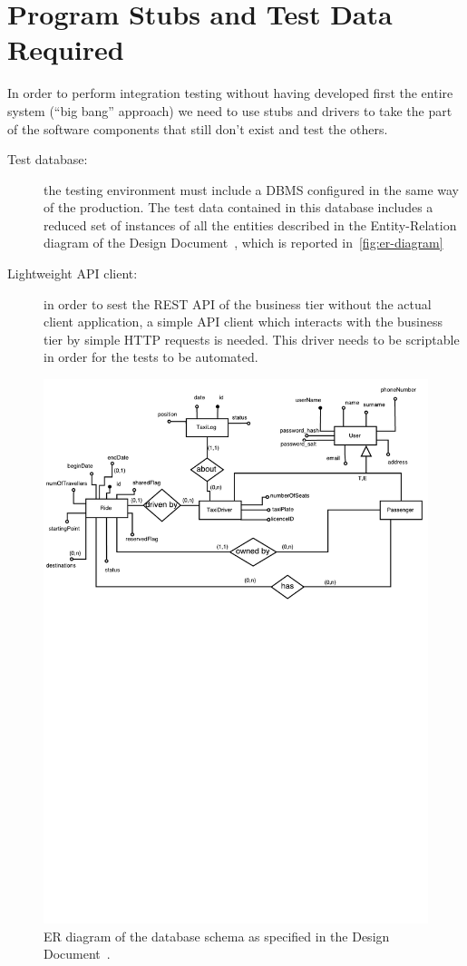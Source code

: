 \chapter{Program Stubs and Test Data Required}
\label{chap:stubs}

In order to perform integration testing without having developed first the entire system (``big bang'' approach) we need to use stubs and drivers to take the part of the software components that still don't exist and test the others.

\begin{description}
    \item[Test database:] the testing environment must include a DBMS configured in the same way of the production. The test data contained in this database includes a reduced set of instances of all the entities described in the Entity-Relation diagram of the Design Document~\cite[p.~10]{mytaxi-dd}, which is reported in~\autoref{fig:er-diagram}

    \item[Lightweight API client:] in order to sest the REST API of the business tier without the actual client application, a simple API client which interacts with the business tier by simple HTTP requests is needed. This driver needs to be scriptable in order for the tests to be automated.
\end{description}

\begin{figure}
    \centering
    \includegraphics[width=\textwidth]{../dd/diagrams/er_diagram.pdf}
    \caption{ER diagram of the database schema as specified in the Design Document~\cite{mytaxi-dd}.}
    \label{fig:er-diagram}
\end{figure}
